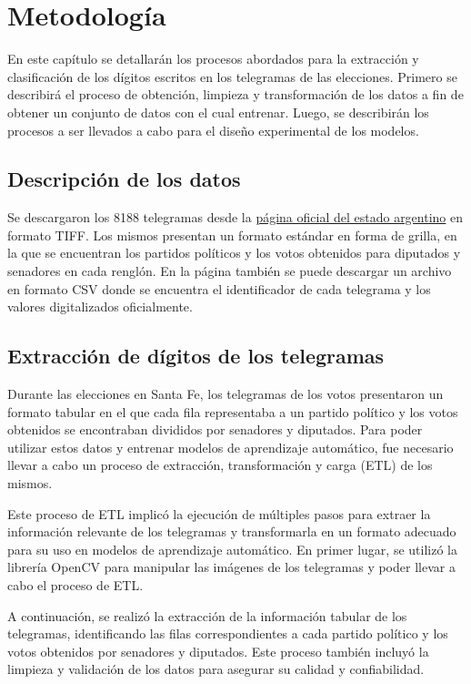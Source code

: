 \chapter{Metodología}

\label{Chapter3}

En este capítulo se detallarán los procesos abordados para la extracción y clasificación de los dígitos escritos en los
telegramas de las elecciones. Primero se describirá el proceso de obtención, limpieza y transformación de los datos a
fin de obtener un conjunto de datos con el cual entrenar. Luego, se describirán los procesos a ser llevados a cabo para
el diseño experimental de los modelos.

\section{Descripción de los datos}

Se descargaron los 8188 telegramas desde la \href{https://op.elecciones.gob.ar/telegramas/generales2021/}{página
    oficial del estado argentino} en formato TIFF. Los mismos presentan un formato estándar en forma de grilla, en la que
se encuentran los partidos políticos y los votos obtenidos para diputados y senadores en cada renglón. En la página
también se puede descargar un archivo en formato CSV donde se encuentra el identificador de cada telegrama y los
valores digitalizados oficialmente.

\section{Extracción de dígitos de los telegramas}

Durante las elecciones en Santa Fe, los telegramas de los votos presentaron un formato tabular en el que cada fila
representaba a un partido político y los votos obtenidos se encontraban divididos por senadores y diputados. Para poder
utilizar estos datos y entrenar modelos de aprendizaje automático, fue necesario llevar a cabo un proceso de
extracción, transformación y carga (ETL) de los mismos.

Este proceso de ETL implicó la ejecución de múltiples pasos para extraer la información relevante de los telegramas y
transformarla en un formato adecuado para su uso en modelos de aprendizaje automático. En primer lugar, se utilizó la
librería OpenCV \parencite{opencv_library} para manipular las imágenes de los telegramas y poder llevar a cabo el proceso de ETL.

A continuación, se realizó la extracción de la información tabular de los telegramas, identificando las filas
correspondientes a cada partido político y los votos obtenidos por senadores y diputados. Este proceso también incluyó
la limpieza y validación de los datos para asegurar su calidad y confiabilidad.

